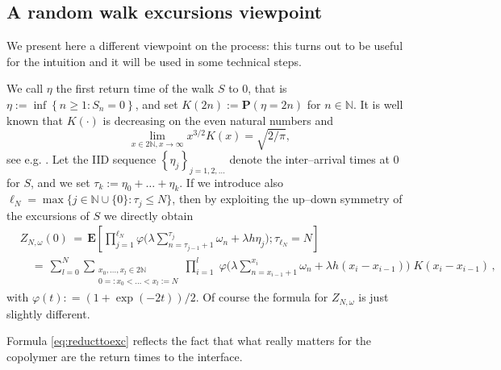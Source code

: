 \documentclass[reqno,11pt]{amsart}
\numberwithin{equation}{section}
\newcommand{\N}{\mathbb{N}}
\newcommand{\bP}{{\ensuremath{\mathbf P}} }
\newcommand{\bE}{{\ensuremath{\mathbf E}} }
\newcommand{\sumtwo}[2]{\sum_{\substack{#1 \\ #2}}} %
\newcommand{\go}{\omega}
\newcommand{\gl}{\lambda}
\begin{document}
 \subsection{A random walk excursions viewpoint}
 \label{sec:notation}
 We present here a different viewpoint on the process:
 this turns out to be useful for the intuition and it will be used
 in some technical steps.

 We call  $\eta$  the first
return time of the walk $S$ to $0$, that is $\eta:=\inf\left\{  n\ge
1:S_{n}=0\right\} $, and  set $K(2n):=\bP \left(\eta=2n\right)$ for $n\in\N$.
It is well known that $K(\cdot)$ is decreasing on the even natural numbers and
\begin{equation}
\label{eq:asympt}
\lim_{x\in 2\N, x\to \infty} x^{3/2} K(x)=
\sqrt{2/\pi },
\end{equation}
see e.g. \cite[Ch. 3]{cf:Feller}.
Let the IID sequence $\left\{ \eta_j \right\}_{j=1,2, \ldots}$
denote the inter--arrival times at $0$ for $S$, and we set $\tau_k := \eta_0 + \ldots + \eta_k$.
 If we introduce also
 $\ell _N =\max\{j \in \N \cup \{0\} :
\tau_j \le N\}$, then by  exploiting
the up--down symmetry of the excursions of $S$  we directly obtain
\begin{equation}
\begin{split}
\label{eq:reducttoexc}
& Z_{N,\go} (0) \, =\, \bE \left[ \prod_{j=1}^{\ell_N} \varphi \Bigg(\gl \sum_{n=\tau_{j-1}+1}^{\tau_j} \go_n + \gl h  \eta_j \Bigg) ; \tau_{\ell_N} = N \right] \\
    & \quad =\, \sum_{l=0}^N \sumtwo{x_0, \ldots, x_l \in 2\N}{0=:x_0 < \ldots < x_l:= N} \prod_{i=1}^l \; \varphi \Bigg(\gl \sum_{n=x_{i-1}+1}^{x_i} \go_n + \gl h  (x_i - x_{i-1}) \Bigg) \; K(x_i - x_{i-1}) \,,
\end{split}
\end{equation}
with $\varphi (t) : =   \left( 1+\exp(-2t)\right) / 2$.
Of course the formula for $Z_{N,\go}$
is just  slightly different.

Formula \eqref{eq:reducttoexc} reflects the fact that what really
matters for the copolymer are the return times to the interface.
\end{document}

